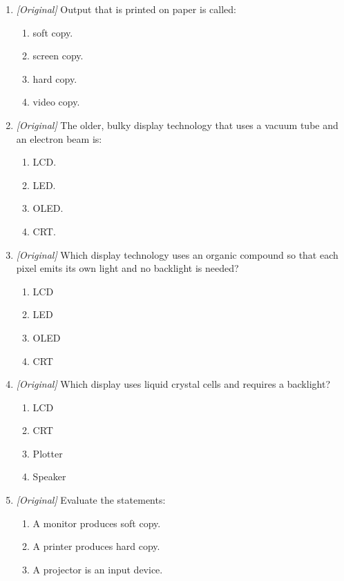 \begin{enumerate}[label=\textbf{Q\arabic*.}, leftmargin=*]
\begin{enumerate}[label=\Alph*.]
  \end{enumerate}
\item \textit{[Original]} Output that is printed on paper is called:
  \begin{enumerate}[label=\Alph*.]
    \item soft copy.
    \item screen copy.
    \item hard copy.
    \item video copy.
  \end{enumerate}
\item \textit{[Original]} The older, bulky display technology that uses a
  vacuum tube and an electron beam is:
  \begin{enumerate}[label=\Alph*.]
    \item LCD.
    \item LED.
    \item OLED.
    \item CRT.
  \end{enumerate}
\item \textit{[Original]} Which display technology uses an organic compound so
  that each pixel emits its own light and no backlight is needed?
  \begin{enumerate}[label=\Alph*.]
    \item LCD
    \item LED
    \item OLED
    \item CRT
  \end{enumerate}
\item \textit{[Original]} Which display uses liquid crystal cells and requires
  a backlight?
  \begin{enumerate}[label=\Alph*.]
    \item LCD
    \item CRT
    \item Plotter
    \item Speaker
  \end{enumerate}
\item \textit{[Original]} Evaluate the statements:
  \begin{enumerate}[label=\Roman*.]
    \item A monitor produces soft copy.
    \item A printer produces hard copy.
    \item A projector is an input device.
  \end{enumerate}
  \begin{enumerate}[label=\Alph*.]

\end{enumerate}
\end{enumerate}

